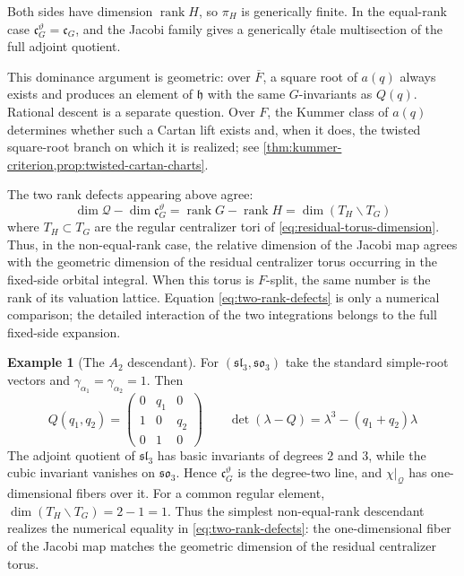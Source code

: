 \documentclass[11pt]{amsart}
\theoremstyle{definition}
\newtheorem{example}[example]{Example}
\theoremstyle{remark}
\newcommand{\Fb}{\overline F}
\newcommand{\cQ}{\mathcal Q}
\newcommand{\rank}{\operatorname{rank}}
\newcommand{\cC}{\mathfrak c}
\newcommand{\h}{\mathfrak h}
\newcommand{\slie}{\mathfrak{sl}}
\newcommand{\solie}{\mathfrak{so}}
\begin{document}
Both sides have dimension $\rank H$, so $\pi_H$ is generically finite.  In
the equal-rank case $\cC_G^\vartheta=\cC_G$, and the Jacobi family gives a
generically \'etale multisection of the full adjoint quotient.

This dominance argument is geometric: over $\Fb$, a square root of $a(q)$
always exists and produces an element of $\h$ with the same $G$-invariants as
$Q(q)$.  Rational descent is a separate question.  Over $F$, the Kummer class
of $a(q)$ determines whether such a Cartan lift exists and, when it does, the
twisted square-root branch on which it is realized; see
\cref{thm:kummer-criterion,prop:twisted-cartan-charts}.

The two rank defects appearing above agree:
\begin{equation}\label{eq:two-rank-defects}
\dim\cQ-\dim\cC_G^\vartheta
=\rank G-\rank H
=\dim(T_H\backslash T_G)
\end{equation}
where $T_H\subset T_G$ are the regular centralizer tori of
\cref{eq:residual-torus-dimension}. Thus, in the non-equal-rank case, the
relative dimension of the Jacobi map agrees with the geometric dimension of
the residual centralizer torus occurring in the fixed-side orbital integral.
When this torus is $F$-split, the same number is the rank of its valuation
lattice.  Equation \eqref{eq:two-rank-defects} is only a numerical comparison;
the detailed interaction of the two integrations belongs to the full
fixed-side expansion.

\begin{example}[The $A_2$ descendant]\label{ex:A2-descendant}
For $(\slie_3,\solie_3)$ take the standard simple-root vectors and
$\gamma_{\alpha_1}=\gamma_{\alpha_2}=1$.  Then
\[
 Q(q_1,q_2)=
 \begin{pmatrix}
 0&q_1&0\\
 1&0&q_2\\
 0&1&0
 \end{pmatrix}
 \qquad
 \det(\lambda-Q)=\lambda^3-(q_1+q_2)\lambda
\]
The adjoint quotient of $\slie_3$ has basic invariants of degrees $2$ and
$3$, while the cubic invariant vanishes on $\solie_3$.  Hence
$\cC_G^\vartheta$ is the degree-two line, and $\chi|_{\cQ}$ has one-dimensional
fibers over it.  For a common regular element,
$\dim(T_H\backslash T_G)=2-1=1$.  Thus the simplest non-equal-rank
descendant realizes the numerical equality in
\eqref{eq:two-rank-defects}: the one-dimensional fiber of the Jacobi map
matches the geometric dimension of the residual centralizer torus.
\end{example}
\end{document}
